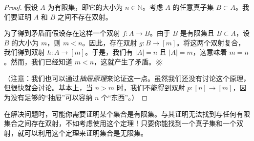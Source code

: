 \begin{proof}
    假设 $A$ 为有限集，即它的大小为 $n \in \mathbb{N}$。考虑 $A$ 的任意真子集 $B \subset A$。我们要证明 $A$ 和 $B$ 之间不存在双射。

    为了得到矛盾而假设存在这样一个双射 $f : A \to B$。由于 $B$ 是有限集且 $B \subset A$，设 $B$ 的大小为 $m$，则 $m < n$。因此，存在双射 $g : B \to [m]$。将这两个双射复合，我们得到双射 $h : A \to [m]$。于是，我们有 $|A| = n$ 且 $|A| = m$，这意味着 $m = n$。然而，我们已经知道 $m < n$，这就产生了矛盾。$\hashx$

    （注意：我们也可以通过\emph{抽屉原理}来论证这一点。虽然我们还没有讨论这个原理，但很快就会讨论。基本上，当 $n > m$ 时，我们不能得到双射 $p:[n] \to [m]$，因为没有足够的``抽屉''可以容纳 $n$ 个``东西''。）
\end{proof}

在解决问题时，可能你需要证明某个集合是有限集。与其证明无法找到与任何有限集合之间存在双射，不如考虑使用这个定理！只要你能找到一个真子集和一个双射，就可以利用这个定理来证明集合是无限集。
